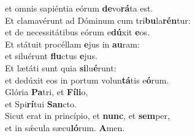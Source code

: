 \oddverse et omnis sapiéntia eórum \textbf{de}vo\textbf{rá}ta est.\\
\evenverse Et clamavérunt ad Dóminum cum tri\textbf{bu}la\textbf{rén}tur:~\*\\
\evenverse et de necessitátibus eórum e\textbf{dú}xit \textbf{e}os.\\
\oddverse Et státuit procéllam \textbf{e}jus in \textbf{au}ram:~\*\\
\oddverse et siluérunt \textbf{flu}ctus \textbf{e}jus.\\
\evenverse Et lætáti sunt quia \textbf{si}lu\textbf{é}runt:~\*\\
\evenverse et dedúxit eos in portum volun\textbf{tá}tis e\textbf{ó}rum.\\
\oddverse Glória \textbf{Pa}tri, et \textbf{Fí}\textbf{li}o,~\*\\
\oddverse et Spi\textbf{rí}tui \textbf{San}cto.\\
\evenverse Sicut erat in princípio, et \textbf{nunc}, et \textbf{sem}per,~\*\\
\evenverse et in sǽcula sæcu\textbf{ló}rum. \textbf{A}men.\\
